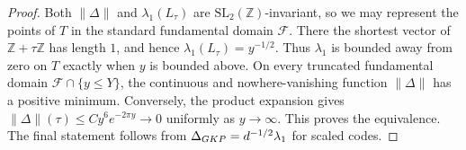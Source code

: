 \documentclass[10pt,a4paper]{amsart}
\newcommand{\CF}{\mathcal{F}}
\newcommand{\SL}{\mathrm{SL}}
\newcommand{\Z}{\mathbb{Z}}
\begin{document}
\begin{proof}
Both $\|\Delta\|$ and $\lambda_1(L_\tau)$ are $\SL_2(\Z)$-invariant, so we may represent the points of $T$ in the standard fundamental domain $\CF$. There the shortest vector of $\Z+\tau\Z$ has length $1$, and hence $\lambda_1(L_\tau)=y^{-1/2}$. Thus $\lambda_1$ is bounded away from zero on $T$ exactly when $y$ is bounded above. On every truncated fundamental domain $\CF\cap\{y\leq Y\}$, the continuous and nowhere-vanishing function $\|\Delta\|$ has a positive minimum. Conversely, the product expansion gives $\|\Delta\|(\tau)\leq C y^6e^{-2\pi y}\to0$ uniformly as $y\to\infty$. This proves the equivalence. The final statement follows from $\Delta_{\rm GKP}=d^{-1/2}\lambda_1$ for scaled codes.
\end{proof}
\end{document}

